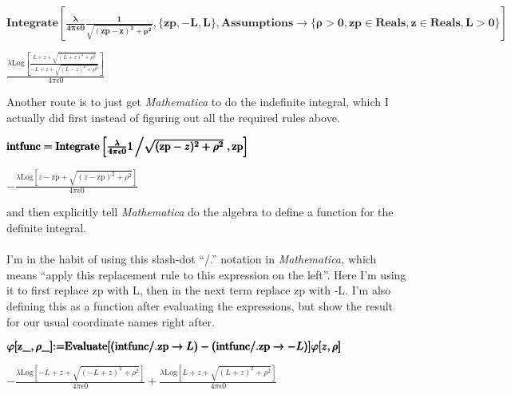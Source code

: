 \documentclass{article}
\begin{document}
\begin{doublespace}
\noindent\(\pmb{\text{Integrate}\left[\frac{\lambda }{4\pi  \text{$\epsilon $0}}\frac{1}{\sqrt{(\text{zp} - z)^2+ \rho ^2}},\{\text{zp},-L,L\},\text{Assumptions}\to \{\rho >0,\text{zp}\in \text{Reals},z\in \text{Reals},L>0\}\right]}\)
\end{doublespace}

\begin{doublespace}
\noindent\(\frac{\lambda  \text{Log}\left[\frac{L+z+\sqrt{(L+z)^2+\rho ^2}}{-L+z+\sqrt{(L-z)^2+\rho ^2}}\right]}{4 \pi  \text{$\epsilon $0}}\)
\end{doublespace}

 Another route is to just get \textit{ Mathematica} to do the indefinite integral, which I actually did first instead of figuring out all the required rules above.

\begin{doublespace}
\noindent\(\pmb{\text{intfunc}=\text{Integrate}\left[\frac{\lambda }{4\pi  \text{$\epsilon $0}}1\left/\sqrt{(\text{zp} - z)^2+ \rho ^2}\right.,\text{zp}\right]}\)
\end{doublespace}

\begin{doublespace}
\noindent\(-\frac{\lambda  \text{Log}\left[z-\text{zp}+\sqrt{(z-\text{zp})^2+\rho ^2}\right]}{4 \pi  \text{$\epsilon $0}}\)
\end{doublespace}

and then explicitly tell \textit{ Mathematica} do the algebra to define a function for the definite integral.\\
\\
I{'}m in the habit of using this slash-dot {``}/.{''} notation in \textit{ Mathematica,} which means {``}apply this replacement rule to this expression on the left{''}. Here I{'}m using it to first replace zp with L, then in the next term replace zp with -L. I{'}m also defining this as a function after evaluating the expressions, but show the result for our usual coordinate names right after.

\begin{doublespace}
\noindent\(\pmb{\varphi [\text{z$\_$},\rho \_]\text{:=}\text{Evaluate}[(\text{intfunc}\text{/.}\text{zp}\to L ) -(\text{intfunc}\text{/.}\text{zp}\to -L)]}\\
\pmb{\varphi [z,\rho ]}\)
\end{doublespace}

\begin{doublespace}
\noindent\(-\frac{\lambda  \text{Log}\left[-L+z+\sqrt{(-L+z)^2+\rho ^2}\right]}{4 \pi  \text{$\epsilon $0}}+\frac{\lambda  \text{Log}\left[L+z+\sqrt{(L+z)^2+\rho ^2}\right]}{4 \pi  \text{$\epsilon $0}}\)
\end{doublespace}
\end{document}
